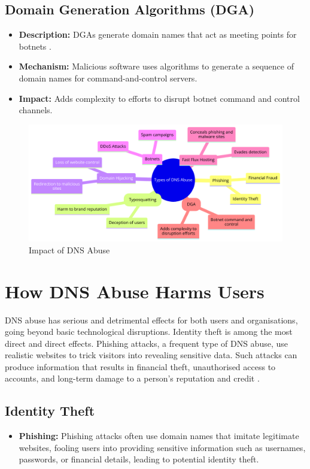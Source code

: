 \subsection{Domain Generation Algorithms (DGA)}
\begin{itemize}
    \item \textbf{Description:} DGAs generate domain names that act as meeting points for botnets \cite{antonakakis2012throw}.
    \item \textbf{Mechanism:} Malicious software uses algorithms to generate a sequence of domain names for command-and-control servers.
    \item \textbf{Impact:} Adds complexity to efforts to disrupt botnet command and control channels.
\end{itemize}
\captionsetup{font= footnotesize}
\begin{figure}[H]
\centering
\includegraphics[width=1.0\textwidth]{background/DNSabuseForms.png}
\caption{Impact of DNS Abuse}
\label{fig:figureThree}
\end{figure}



\section{How DNS Abuse Harms Users}

DNS abuse has serious and detrimental effects for both users and organisations, going beyond basic technological disruptions. Identity theft is among the most direct and direct effects. Phishing attacks, a frequent type of DNS abuse, use realistic websites to trick visitors into revealing sensitive data. Such attacks can produce information that results in financial theft, unauthorised access to accounts, and long-term damage to a person's reputation and credit \cite{godaddy2023dnsabuse}.

\subsection{Identity Theft}
\begin{itemize}
    \item \textbf{Phishing:} Phishing attacks often use domain names that imitate legitimate websites, fooling users into providing sensitive information such as usernames, passwords, or financial details, leading to potential identity theft.
\end{itemize}

